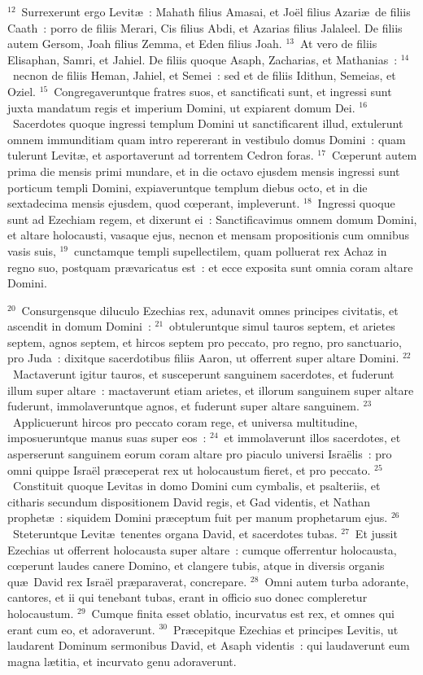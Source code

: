 ${}^{12}$~Surrexerunt ergo Levit\ae~: Mahath filius Amasai, et Jo\"el filius Azari\ae\ de filiis Caath~: porro de filiis Merari, Cis filius Abdi, et Azarias filius Jalaleel. De filiis autem Gersom, Joah filius Zemma, et Eden filius Joah.
${}^{13}$~At vero de filiis Elisaphan, Samri, et Jahiel. De filiis quoque Asaph, Zacharias, et Mathanias~:
${}^{14}$~necnon de filiis Heman, Jahiel, et Semei~: sed et de filiis Idithun, Semeias, et Oziel.
${}^{15}$~Congregaveruntque fratres suos, et sanctificati sunt, et ingressi sunt juxta mandatum regis et imperium Domini, ut expiarent domum Dei.
${}^{16}$~Sacerdotes quoque ingressi templum Domini ut sanctificarent illud, extulerunt omnem immunditiam quam intro repererant in vestibulo domus Domini~: quam tulerunt Levit\ae , et asportaverunt ad torrentem Cedron foras.
${}^{17}$~Cœperunt autem prima die mensis primi mundare, et in die octavo ejusdem mensis ingressi sunt porticum templi Domini, expiaveruntque templum diebus octo, et in die sextadecima mensis ejusdem, quod cœperant, impleverunt.
${}^{18}$~Ingressi quoque sunt ad Ezechiam regem, et dixerunt ei~: Sanctificavimus omnem domum Domini, et altare holocausti, vasaque ejus, necnon et mensam propositionis cum omnibus vasis suis,
${}^{19}$~cunctamque templi supellectilem, quam polluerat rex Achaz in regno suo, postquam pr\ae varicatus est~: et ecce exposita sunt omnia coram altare Domini.


${}^{20}$~Consurgensque diluculo Ezechias rex, adunavit omnes principes civitatis, et ascendit in domum Domini~:
${}^{21}$~obtuleruntque simul tauros septem, et arietes septem, agnos septem, et hircos septem pro peccato, pro regno, pro sanctuario, pro Juda~: dixitque sacerdotibus filiis Aaron, ut offerrent super altare Domini.
${}^{22}$~Mactaverunt igitur tauros, et susceperunt sanguinem sacerdotes, et fuderunt illum super altare~: mactaverunt etiam arietes, et illorum sanguinem super altare fuderunt, immolaveruntque agnos, et fuderunt super altare sanguinem.
${}^{23}$~Applicuerunt hircos pro peccato coram rege, et universa multitudine, imposueruntque manus suas super eos~:
${}^{24}$~et immolaverunt illos sacerdotes, et asperserunt sanguinem eorum coram altare pro piaculo universi Isra\"elis~: pro omni quippe Isra\"el pr\ae ceperat rex ut holocaustum fieret, et pro peccato.
${}^{25}$~Constituit quoque Levitas in domo Domini cum cymbalis, et psalteriis, et citharis secundum dispositionem David regis, et Gad videntis, et Nathan prophet\ae~: siquidem Domini pr\ae ceptum fuit per manum prophetarum ejus.
${}^{26}$~Steteruntque Levit\ae\ tenentes organa David, et sacerdotes tubas.
${}^{27}$~Et jussit Ezechias ut offerrent holocausta super altare~: cumque offerrentur holocausta, cœperunt laudes canere Domino, et clangere tubis, atque in diversis organis qu\ae\ David rex Isra\"el pr\ae paraverat, concrepare.
${}^{28}$~Omni autem turba adorante, cantores, et ii qui tenebant tubas, erant in officio suo donec compleretur holocaustum.
${}^{29}$~Cumque finita esset oblatio, incurvatus est rex, et omnes qui erant cum eo, et adoraverunt.
${}^{30}$~Pr\ae cepitque Ezechias et principes Levitis, ut laudarent Dominum sermonibus David, et Asaph videntis~: qui laudaverunt eum magna l\ae titia, et incurvato genu adoraverunt.


